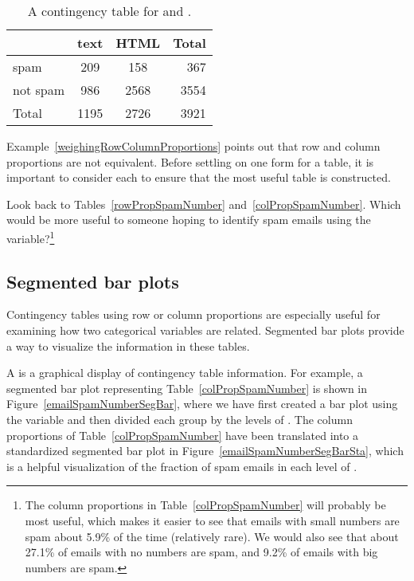 \begin{table}[ht]
\centering
\begin{tabular}{l cc r}
  \hline
 & text & HTML & Total \\ 
  \hline
spam & 209 & 158 & 367 \\ 
not spam & 986 & 2568 & 3554 \\ 
   \hline
Total & 1195 & 2726 & 3921 \\
   \hline
\end{tabular}
\caption{A contingency table for  and .}
\label{emailSpamHTMLTableTotals}
\end{table}

Example~\ref{weighingRowColumnProportions} points out that row and column proportions are not equivalent. Before settling on one form for a table, it is important to consider each to ensure that the most useful table is constructed.

\begin{exercise}
Look back to Tables~\ref{rowPropSpamNumber} and~\ref{colPropSpamNumber}. Which would be more useful to someone hoping to identify spam emails using the  variable?\footnote{The column proportions in Table~\ref{colPropSpamNumber} will probably be most useful, which makes it easier to see that emails with small numbers are spam about 5.9\% of the time (relatively rare). We would also see that about 27.1\% of emails with no numbers are spam, and 9.2\% of emails with big numbers are spam.}
\end{exercise}

\subsection{Segmented bar plots}
\label{segmentedBarPlotsAndIndependence}

Contingency tables using row or column proportions are especially useful for examining how two categorical variables are related. Segmented bar plots provide a way to visualize the information in these tables.

A  is a graphical display of contingency table information. For example, a segmented bar plot representing Table~\ref{colPropSpamNumber} is shown in Figure~\ref{emailSpamNumberSegBar}, where we have first created a bar plot using the  variable and then divided each group by the levels of . The column proportions of Table~\ref{colPropSpamNumber} have been translated into a standardized segmented bar plot in Figure~\ref{emailSpamNumberSegBarSta}, which is a helpful visualization of the fraction of spam emails in each level of .

